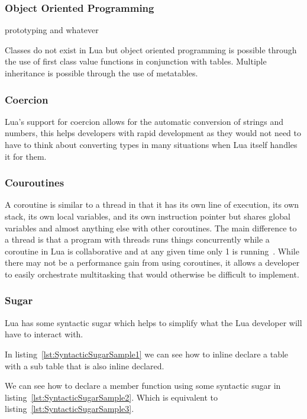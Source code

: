 \documentclass[11pt,a4paper,titlepage]{article}
\begin{document}
\subsubsection{Object Oriented Programming}
	prototyping and whatever

	Classes do not exist in Lua but object oriented programming is possible through the use of first class value functions in conjunction with tables. Multiple inheritance is possible through the use of metatables.

\subsubsection{Coercion}
	Lua's support for coercion allows for the automatic conversion of strings and numbers, this helps developers with rapid development as they would not need to have to think about converting types in many situations when Lua itself handles it for them.

\subsubsection{Couroutines}
	A coroutine is similar to a thread in that it has its own line of execution, its own stack, its own local variables, and its own instruction pointer but shares global variables and almost anything else with other coroutines. The main difference to a thread is that a program with threads runs things concurrently while a coroutine in Lua is collaborative and at any given time only 1 is running~\cite{Ierusalimschy:2013:PLT:2502646}. While there may not be a performance gain from using coroutines, it allows a developer to easily orchestrate multitasking that would otherwise be difficult to implement.

\subsubsection{Sugar}
	Lua has some syntactic sugar which helps to simplify what the Lua developer will have to interact with.

	
	In listing~\ref{lst:SyntacticSugarSample1} we can see how to inline declare a table with a sub table that is also inline declared.

	
	We can see how to declare a member function using some syntactic sugar in listing~\ref{lst:SyntacticSugarSample2}. Which is equivalent to listing~\ref{lst:SyntacticSugarSample3}.
\end{document}
